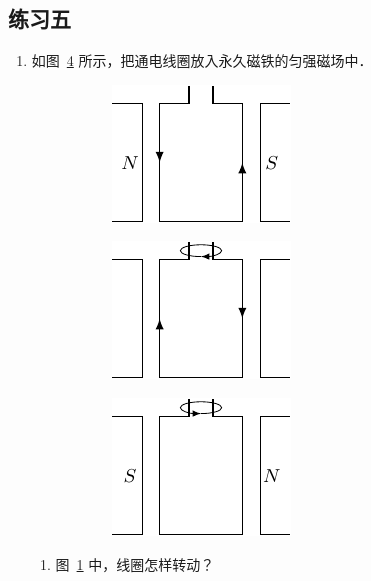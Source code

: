 \subsection*{练习五}
\begin{enumerate}
    \item 如图~\ref{fig_C_1-33} 所示，把通电线圈放入永久磁铁的匀强磁场中．
    \begin{figure}[htbp]
        \centering
        \begin{subfigure}{0.3\linewidth}
            \centering
            \includegraphics{fig/C/1-33a.pdf}
            \caption{}\label{fig_C_1-33a}
        \end{subfigure}
        \hfil
        \begin{subfigure}{0.3\linewidth}
            \centering
            \includegraphics{fig/C/1-33b.pdf}
            \caption{}\label{fig_C_1-33b}
        \end{subfigure}
        \hfil
        \begin{subfigure}{0.3\linewidth}
            \centering
            \includegraphics{fig/C/1-33c.pdf}
            \caption{}\label{fig_C_1-33c}
        \end{subfigure}
        \caption{}\label{fig_C_1-33}
    \end{figure}
    \begin{enumerate}
        \item 图~\ref{fig_C_1-33a} 中，线圈怎样转动？

\end{enumerate}
\end{enumerate}
